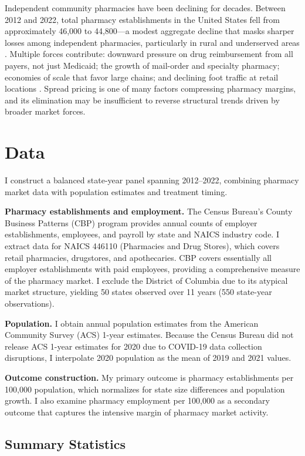 \documentclass[12pt]{article}
\begin{document}
Independent community pharmacies have been declining for decades. Between 2012 and 2022, total pharmacy establishments in the United States fell from approximately 46,000 to 44,800---a modest aggregate decline that masks sharper losses among independent pharmacies, particularly in rural and underserved areas \citep{lookinsight2023closures}. Multiple forces contribute: downward pressure on drug reimbursement from all payers, not just Medicaid; the growth of mail-order and specialty pharmacy; economies of scale that favor large chains; and declining foot traffic at retail locations \citep{schommer2020pharmacist}. Spread pricing is one of many factors compressing pharmacy margins, and its elimination may be insufficient to reverse structural trends driven by broader market forces.

\section{Data}

I construct a balanced state-year panel spanning 2012--2022, combining pharmacy market data with population estimates and treatment timing.

\textbf{Pharmacy establishments and employment.} The Census Bureau's County Business Patterns (CBP) program provides annual counts of employer establishments, employees, and payroll by state and NAICS industry code. I extract data for NAICS 446110 (Pharmacies and Drug Stores), which covers retail pharmacies, drugstores, and apothecaries. CBP covers essentially all employer establishments with paid employees, providing a comprehensive measure of the pharmacy market. I exclude the District of Columbia due to its atypical market structure, yielding 50 states observed over 11 years (550 state-year observations).

\textbf{Population.} I obtain annual population estimates from the American Community Survey (ACS) 1-year estimates. Because the Census Bureau did not release ACS 1-year estimates for 2020 due to COVID-19 data collection disruptions, I interpolate 2020 population as the mean of 2019 and 2021 values.

\textbf{Outcome construction.} My primary outcome is pharmacy establishments per 100,000 population, which normalizes for state size differences and population growth. I also examine pharmacy employment per 100,000 as a secondary outcome that captures the intensive margin of pharmacy market activity.

\subsection{Summary Statistics}
\end{document}
